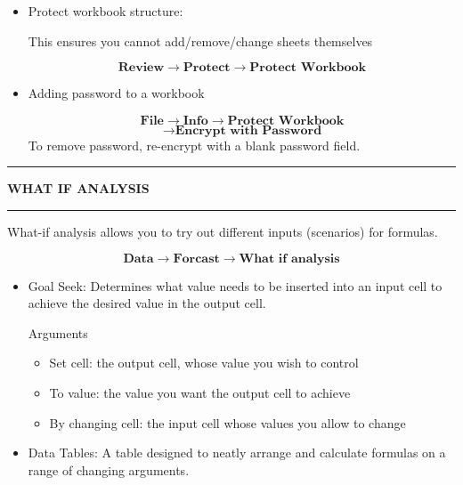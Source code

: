 \documentclass[8pt]{extarticle}
\newcommand{\heading}[1]{%
    \noindent
    \rule{\linewidth}{0.4pt}
    \begin{center}
        \vspace{-1ex}
        \textbf{#1}        
        \vspace{-2.5ex}
    \end{center}
    \rule{\linewidth}{0.4pt}
}
\begin{document}
\begin{multicols}{3}
\begin{itemize}
    \item Protect workbook structure:

    This ensures you cannot add/remove/change sheets themselves

    \[\textbf{Review} \rightarrow \textbf{Protect} \rightarrow \textbf{Protect Workbook}\]

    \item Adding password to a workbook

    \[ \textbf{File} \rightarrow \textbf{Info} \rightarrow \textbf{Protect Workbook}\]
    \[ \rightarrow \textbf{Encrypt with Password}\]
    To remove password, re-encrypt with a blank password field.
\end{itemize}

\columnbreak
\heading{WHAT IF ANALYSIS}

What-if analysis allows you to try out different inputs (scenarios) for formulas.

\[ \textbf{Data} \rightarrow \textbf{Forcast} \rightarrow \textbf{What if analysis}\]

\begin{itemize}
    \item Goal Seek: Determines what value needs to be inserted into an input cell to achieve the desired value in the output cell. 

    Arguments
    \begin{itemize}
        \item Set cell: the output cell, whose value you wish to control
        \item To value: the value you want the output cell to achieve
        \item By changing cell: the input cell whose values you allow to change
    \end{itemize}

    \item Data Tables: A table designed to neatly arrange and calculate formulas on a range of changing arguments. 


\end{itemize}
\end{multicols}
\end{document}
